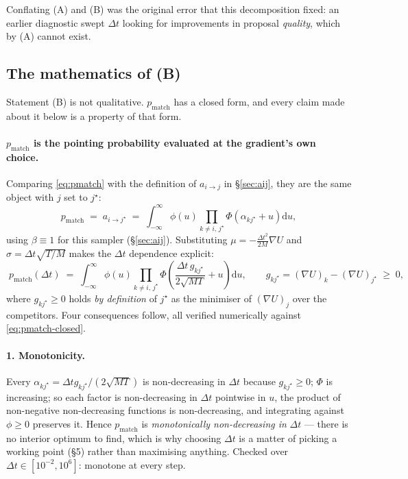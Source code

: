\documentclass[11pt,a4paper]{article}
\newcommand{\dt}{\Delta t}
\newcommand{\gradU}{\nabla U}
\newcommand{\pmatch}{p_{\mathrm{match}}}
\newcommand{\Mass}{M}
\begin{document}
Conflating (A) and (B) was the original error that this decomposition fixed:
an earlier diagnostic swept $\dt$ looking for improvements in proposal
\emph{quality}, which by (A) cannot exist.

\subsection{The mathematics of (B)}
\label{sec:Bmath}

Statement (B) is not qualitative. $\pmatch$ has a closed form, and every claim
made about it below is a property of that form.

\paragraph{$\pmatch$ is the pointing probability evaluated at the gradient's
own choice.} Comparing \eqref{eq:pmatch} with the definition of $a_{i\to j}$
in \S\ref{sec:aij}, they are the same object with $j$ set to $j^{\star}$:
\begin{equation}
  \pmatch \;=\; a_{i\to j^{\star}}
  \;=\; \int_{-\infty}^{\infty}\! \phi(u)
        \prod_{k \neq i,\,j^{\star}}
        \Phi\!\left(\alpha_{kj^{\star}} + u\right)\mathrm{d}u ,
\end{equation}
using $\beta \equiv 1$ for this sampler (\S\ref{sec:aij}). Substituting
$\mu = -\frac{\dt^{2}}{2\Mass}\gradU$ and $\sigma = \dt\sqrt{T/\Mass}$ makes
the $\dt$ dependence explicit:
\begin{equation}
  \boxed{\;
  \pmatch(\dt)
  \;=\; \int_{-\infty}^{\infty}\! \phi(u)
        \prod_{k \neq i,\,j^{\star}}
        \Phi\!\left(\frac{\dt\, g_{kj^{\star}}}{2\sqrt{\Mass T}} + u\right)
        \mathrm{d}u ,
  \qquad
  g_{kj^{\star}} = (\gradU)_{k} - (\gradU)_{j^{\star}} \;\ge\; 0 ,
  \;}
  \label{eq:pmatch-closed}
\end{equation}
where $g_{kj^{\star}} \ge 0$ holds \emph{by definition} of $j^{\star}$ as the
minimiser of $(\gradU)_{j}$ over the competitors. Four consequences follow,
all verified numerically against \eqref{eq:pmatch-closed}.

\paragraph{1. Monotonicity.} Every $\alpha_{kj^{\star}} = \dt
g_{kj^{\star}}/(2\sqrt{\Mass T})$ is non-decreasing in $\dt$ because
$g_{kj^{\star}}\ge0$; $\Phi$ is increasing; so each factor is non-decreasing
in $\dt$ pointwise in $u$, the product of non-negative non-decreasing
functions is non-decreasing, and integrating against $\phi \ge 0$ preserves
it. Hence $\pmatch$ is \emph{monotonically non-decreasing in} $\dt$ --- there
is no interior optimum to find, which is why choosing $\dt$ is a matter of
picking a working point (\S5) rather than maximising anything. Checked over
$\dt \in [10^{-2},10^{6}]$: monotone at every step.
\end{document}
